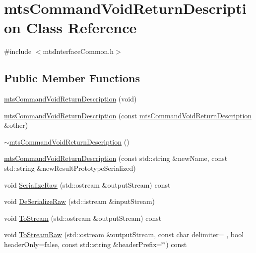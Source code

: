 \hypertarget{classmts_command_void_return_description}{}\section{mts\+Command\+Void\+Return\+Description Class Reference}
\label{classmts_command_void_return_description}


{\ttfamily \#include $<$mts\+Interface\+Common.\+h$>$}

\subsection*{Public Member Functions}
\begin{DoxyCompactItemize}
\item 
\hyperlink{classmts_command_void_return_description_a5e553b0b76c89ae551b4be9a4ff587c2}{mts\+Command\+Void\+Return\+Description} (void)
\item 
\hyperlink{classmts_command_void_return_description_a5dd8fb7683018b87984f0fe233941867}{mts\+Command\+Void\+Return\+Description} (const \hyperlink{classmts_command_void_return_description}{mts\+Command\+Void\+Return\+Description} \&other)
\item 
\hyperlink{classmts_command_void_return_description_a2e610f6878953b416009818393211eb5}{$\sim$mts\+Command\+Void\+Return\+Description} ()
\item 
\hyperlink{classmts_command_void_return_description_ac78bfee8a6f6efb9bb5db8666815c06c}{mts\+Command\+Void\+Return\+Description} (const std\+::string \&new\+Name, const std\+::string \&new\+Result\+Prototype\+Serialized)
\item 
void \hyperlink{classmts_command_void_return_description_a813973766ca559b195e685686cd52540}{Serialize\+Raw} (std\+::ostream \&output\+Stream) const 
\item 
void \hyperlink{classmts_command_void_return_description_a3ea55edb4e0b1ee6770c0d95bda223c6}{De\+Serialize\+Raw} (std\+::istream \&input\+Stream)
\item 
void \hyperlink{classmts_command_void_return_description_ac7674aef35d30359cd31b89bb4f3b565}{To\+Stream} (std\+::ostream \&output\+Stream) const 
\item 
void \hyperlink{classmts_command_void_return_description_aa1a66f295c20ba07e2a0fb5422e3f1ea}{To\+Stream\+Raw} (std\+::ostream \&output\+Stream, const char delimiter= \textquotesingle{} \textquotesingle{}, bool header\+Only=false, const std\+::string \&header\+Prefix=\char`\"{}\char`\"{}) const 

\end{DoxyCompactItemize}
